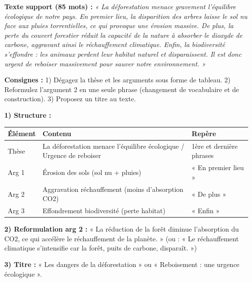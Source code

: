 \documentclass[11pt]{article}
\begin{document}
\begin{exercice}
\textbf{Texte support (85 mots) :}
\emph{« La déforestation menace gravement l'équilibre écologique de notre pays. En premier lieu, la disparition des arbres laisse le sol nu face aux pluies torrentielles, ce qui provoque une érosion massive. De plus, la perte du couvert forestier réduit la capacité de la nature à absorber le dioxyde de carbone, aggravant ainsi le réchauffement climatique. Enfin, la biodiversité s'effondre : les animaux perdent leur habitat naturel et disparaissent. Il est donc urgent de reboiser massivement pour sauver notre environnement. »}

\textbf{Consignes :}
1) Dégagez la thèse et les arguments sous forme de tableau.
2) Reformulez l'argument 2 en une seule phrase (changement de vocabulaire et de construction).
3) Proposez un titre au texte.
\end{exercice}

\begin{corrige}[Exercice 1]
\textbf{1) Structure :}
\begin{center}
\begin{tabularx}{\linewidth}{|l|X|X|}\hline
\rowcolor{popblueL} \textbf{Élément} & \textbf{Contenu} & \textbf{Repère} \\ \hline
Thèse & La déforestation menace l'équilibre écologique / Urgence de reboiser & 1ère et dernière phrases \\ \hline
Arg 1 & Érosion des sols (sol nu + pluies) & « En premier lieu » \\ \hline
Arg 2 & Aggravation réchauffement (moins d'absorption CO2) & « De plus » \\ \hline
Arg 3 & Effondrement biodiversité (perte habitat) & « Enfin » \\ \hline
\end{tabularx}
\end{center}

\textbf{2) Reformulation arg 2 :} « La réduction de la forêt diminue l'absorption du CO2, ce qui accélère le réchauffement de la planète. » (ou : « Le réchauffement climatique s'intensifie car la forêt, puits de carbone, disparaît. »)

\textbf{3) Titre :} « Les dangers de la déforestation » ou « Reboisement : une urgence écologique ».
\end{corrige}
\end{document}
